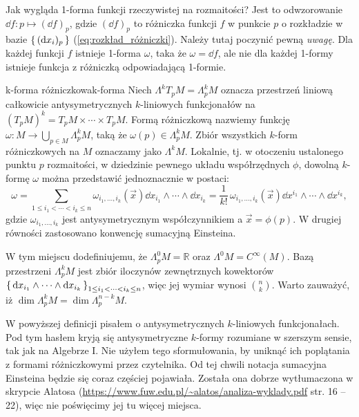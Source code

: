 \documentclass{article}
\begin{document}
Jak wygląda 1-forma funkcji rzeczywistej na rozmaitości? Jest to odwzorowanie $\dd{f}: p\mapsto (\dd{f})_p$, gdzie $(\dd{f})_p$ to różniczka funkcji $f$ w punkcie $p$ o rozkładzie w bazie $\set{(\dd{x_i})_p}$ (\ref{eq:rozkład_różniczki}). Należy tutaj poczynić pewną \textit{uwagę}. Dla każdej funkcji $f$ istnieje 1-forma $\omega$, taka że $\omega=\dd{f}$, ale nie dla każdej 1-formy istnieje funkcja z różniczką odpowiadającą 1-formie. 


\begin{dfn}{k-forma różniczkowa}{k-forma}
  Niech $\Lambda^k T_pM = \Lambda^k_pM$ oznacza przestrzeń liniową całkowicie antysymetrycznych $k$-liniowych funkcjonałów na $(T_pM)^k=T_pM\times\cdots\times T_pM$. Formą różniczkową nazwiemy funkcję $\omega: M\to \bigcup_{p\in M} \Lambda^k_p M$, taką że $\omega(p)\in \Lambda^k_p M$. Zbiór wszystkich $k$-form różniczkowych na $M$ oznaczamy jako $\Lambda^k M$. Lokalnie, tj. w otoczeniu ustalonego punktu $p$ rozmaitości, w dziedzinie pewnego układu współrzędnych $\phi$, dowolną $k$-formę $\omega$ można przedstawić jednoznacznie w postaci:
  \[
  \omega = \sum_{1\leq i_1 < \cdots < i_k \leq n} \omega_{i_1,\ldots, i_k}(\vec{x}) \dd{x}_{i_1}\wedge\cdots\wedge\dd{x}_{i_k} 
  = \frac{1}{k!}\,\omega_{i_1,\ldots, i_k}(\vec{x})\dd{x}^{i_1}\wedge\cdots\wedge\dd{x}^{i_k},
  \]
  gdzie $\omega_{i_1,\ldots, i_k}$ jest antysymetrycznym współczynnikiem a $\vec{x}=\phi(p)$. W drugiej równości zastosowano konwencję sumacyjną Einsteina.
\end{dfn}
W tym miejscu dodefiniujemu, że $\Lambda^0_p M=\mathbb{R}$ oraz $\Lambda^0M=C^{\infty}(M)$. Bazą przestrzeni $\Lambda^k_p M$ jest zbiór iloczynów zewnętrznych kowektorów $\set{\dd{x_{i_1}}\wedge\cdots\wedge\dd{x_{i_k}}}_{1\leq i_1<\cdots<i_k\leq n}$, więc jej wymiar wynosi $\binom{n}{k}$. Warto zauważyć, iż $\dim{\Lambda^k_p M}=\dim{\Lambda^{n-k}_p M}$.

W powyższej definicji pisałem o antysymetrycznych $k$-liniowych funkcjonałach. Pod tym hasłem kryją się antysymetryczne $k$-formy rozumiane w szerszym sensie, tak jak na Algebrze I. Nie użyłem tego sformułowania, by uniknąć ich poplątania z formami różniczkowymi przez czytelnika. Od tej chwili notacja sumacyjna Einsteina będzie się coraz częściej pojawiała. Została ona dobrze wytłumaczona w skrypcie Alatosa (\url{https://www.fuw.edu.pl/~alatos/analiza-wyklady.pdf} str. 16 -- 22), więc nie poświęcimy jej tu więcej miejsca.
\end{document}
